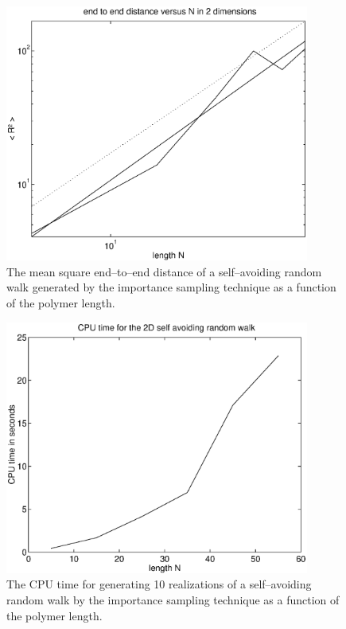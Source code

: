 \begin{figure}
\label{F_SAW2}
\includegraphics[width=10cm]{./Figures/f_saw2.eps}
\caption{The mean square end--to--end distance of a 
self--avoiding random walk generated by the importance sampling
technique as a function of the polymer length.}
\end{figure}

\begin{figure}
\label{F_SAW3}
\includegraphics[width=10cm]{./Figures/f_saw3.eps}
\caption{The CPU time for generating 10 realizations  of a 
self--avoiding random walk  by the importance sampling
technique as a function of the polymer length.}
\end{figure}


